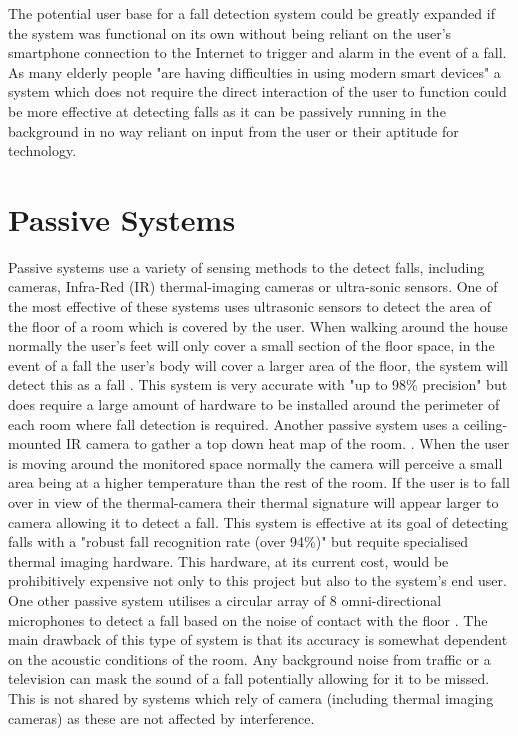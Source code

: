 \documentclass[11pt,a4paper]{report}
\begin{document}
The potential user base for a fall detection system could be greatly expanded if the system was functional on its own without being reliant on the user's smartphone connection to the Internet to trigger and alarm in the event of a fall. As many elderly people "are having difficulties in using modern smart devices" \citep{William_Cognitive_modeling_in_human_computer_interaction} a system which does not require the direct interaction of the user to function could be more effective at detecting falls as it can be passively running in the background in no way reliant on input from the user or their aptitude for technology.

\section{Passive Systems}
Passive systems use a variety of sensing methods to the detect falls, including cameras, Infra-Red (IR) thermal-imaging cameras or ultra-sonic sensors. One of the most effective of these systems uses ultrasonic sensors to detect the area of the floor of a room which is covered by the user. When walking around the house normally the user's feet will only cover a small section of the floor space, in the event of a fall the user's body will cover a larger area of the floor, the system will detect this as a fall \citep{Chang_Human_fall_detection_based_on_event}. This system is very accurate with "up to 98\% precision" but does require a large amount of hardware to be installed around the perimeter of each room where fall detection is required. Another passive system uses a ceiling-mounted IR camera to gather a top down heat map of the room. \citep{Hayashida_The_use_of_thermal_ir_array}. When the user is moving around the monitored space normally the camera will perceive a small area being at a higher temperature than the rest of the room. If the user is to fall over in view of the thermal-camera their thermal signature will appear larger to camera allowing it to detect a fall. This system is effective at its goal of detecting falls with a "robust fall recognition rate (over 94\%)" but requite specialised thermal imaging hardware. This hardware, at its current cost, would be prohibitively expensive not only to this project but also to the system's end user. One other passive system utilises a circular array of 8 omni-directional microphones to detect a fall based on the noise of contact with the floor \citep{Li_A_microphone_array}. The main drawback of this type of system is that its accuracy is somewhat dependent on the acoustic conditions of the room. Any background noise from traffic or a television can mask the sound of a fall potentially allowing for it to be missed. This is not shared by systems which rely of camera (including thermal imaging cameras) as these are not affected by interference.
\end{document}
